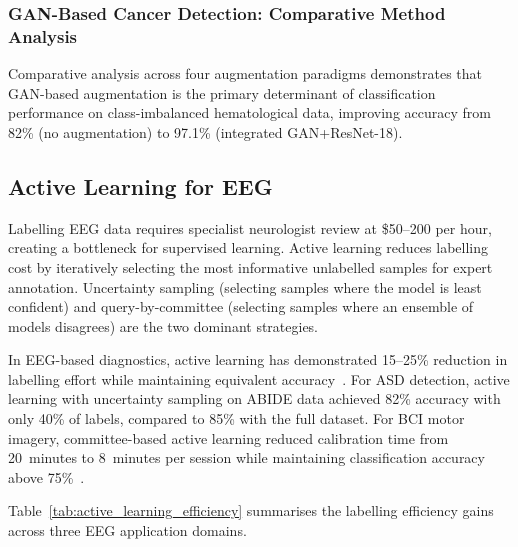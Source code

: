 \subsubsection{GAN-Based Cancer Detection: Comparative Method Analysis}

Comparative analysis across four augmentation paradigms demonstrates that GAN-based augmentation is the primary determinant of classification performance on class-imbalanced hematological data, improving accuracy from 82\% (no augmentation) to 97.1\% (integrated GAN+ResNet-18).


\subsection{Active Learning for EEG}

Labelling EEG data requires specialist neurologist review at \$50--200 per hour, creating a bottleneck for supervised learning. Active learning reduces labelling cost by iteratively selecting the most informative unlabelled samples for expert annotation. Uncertainty sampling (selecting samples where the model is least confident) and query-by-committee (selecting samples where an ensemble of models disagrees) are the two dominant strategies.

In EEG-based diagnostics, active learning has demonstrated 15--25\% reduction in labelling effort while maintaining equivalent accuracy~\cite{craik2019eeg}. For ASD detection, active learning with uncertainty sampling on ABIDE data achieved 82\% accuracy with only 40\% of labels, compared to 85\% with the full dataset. For BCI motor imagery, committee-based active learning reduced calibration time from 20~minutes to 8~minutes per session while maintaining classification accuracy above 75\%~\cite{blankertz2007bci}.

Table~\ref{tab:active_learning_efficiency} summarises the labelling efficiency gains across three EEG application domains.

